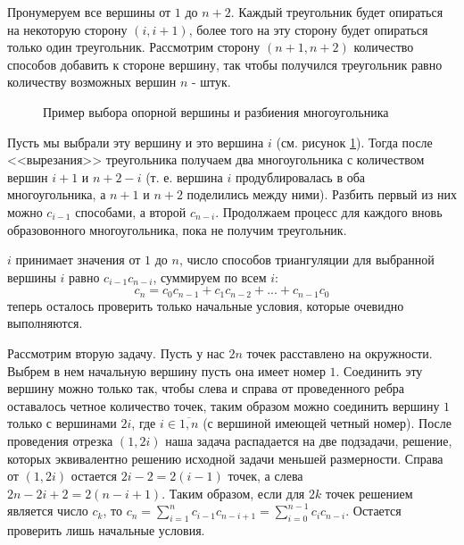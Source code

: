 \documentclass[a4paper,12pt]{article}
\begin{document}
\begin{Solution}
Пронумеруем все вершины от $1$ до $n+2$. Каждый треугольник будет опираться на некоторую сторону $(i, i+1)$, более того на эту сторону будет опираться только один треугольник. Рассмотрим сторону $(n+1, n+2)$ количество способов добавить к стороне вершину, так чтобы получился треугольник равно количеству возможных вершин $n$ - штук.

\begin{figure}[h]
\caption{Пример выбора опорной вершины и разбиения многоугольника}
\label{img::simplex}
\end{figure}

Пусть мы выбрали эту вершину и это вершина $i$ (см. рисунок \ref{img::simplex}). Тогда после <<вырезания>> треугольника получаем два многоугольника с количеством вершин $i+1$ и $n + 2 - i$ (т. е. вершина $i$ продублировалась в оба многоугольника, а $n+1$ и $n+2$ поделились между ними). Разбить первый из них можно $c_{i-1}$ способами, а второй $c_{n-i}$. Продолжаем процесс для каждого вновь образовонного многоугольника, пока не получим треугольник.

$i$ принимает значения от $1$ до $n$, число способов триангуляции для выбранной вершины $i$ равно $c_{i-1} c_{n-i}$, суммируем по всем $i$:
\[
	c_{n} = c_0 c_{n-1} + c_1 c_{n-2} + ... + c_{n-1} c_0
\]
теперь осталось проверить только начальные условия, которые очевидно выполняются.

Рассмотрим вторую задачу. Пусть у нас $2n$ точек расставлено на окружности. Выбрем в нем начальную вершину пусть она имеет номер $1$. Соединить эту вершину можно только так, чтобы слева и справа от проведенного ребра оставалось четное количество точек, таким образом можно соединить вершину $1$ только с вершинами $2i$, где $i \in \overline{1,n}$ (с вершиной имеющей четный номер). После проведения отрезка $(1, 2i)$ наша задача распадается на две подзадачи, решение, которых эквивалентно решению исходной задачи меньшей размерности. Справа от $(1, 2i)$ остается $2i - 2 = 2(i-1)$ точек, а слева $2n - 2i + 2 = 2(n-i+1)$. Таким образом, если для $2k$ точек решением является число $c_k$, то $c_n = \sum_{i=1}^n c_{i-1} c_{n-i+1} = \sum_{i=0}^{n-1} c_i c_{n-i}$. Остается проверить лишь начальные условия.


\end{Solution}
\end{document}
